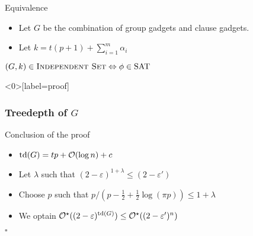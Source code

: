 \begin{frame}{Equivalence}
    \centering
    \begin{itemize}
        \item Let $G$ be the combination of group gadgets and clause gadgets.
        \item Let $k = t(p+1)+ \sum_{i = 1}^m \alpha_i$
    \end{itemize}

    \vspace{1cm}

    $(G, k) \in \textsc{Independent Set} \Leftrightarrow \phi \in \text{SAT}$
\end{frame}

\begin{frame}<0>[label=proof]
    \frametitle{Treedepth of $G$}
\end{frame}


\begin{frame}{Conclusion of the proof}
    \begin{itemize}
        \item $\text{td}(G) = tp + \mathcal{O}(\log n) + c$
        \item Let $\lambda$ such that $(2 - \varepsilon)^{1 + \lambda} \leq (2 - \varepsilon')$
        \item Choose $p$ such that $p/(p - \frac{1}{2} + \frac{1}{2} \log(\pi p)) \leq 1 + \lambda$
        \item We optain $\mathcal{O}^\star((2 - \varepsilon)^{\text{td}(G)}) \leq \mathcal{O}^\star((2 - \varepsilon')^n)$
    \end{itemize}

    \hfill$\square$
\end{frame}